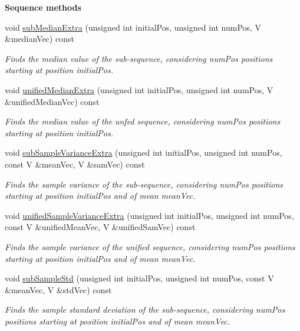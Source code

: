 \begin{Indent}{\bf Sequence methods}
\begin{DoxyCompactItemize}
void \hyperlink{class_q_u_e_s_o_1_1_sequence_of_vectors_ab2ebb58b191d40323da456b82fad2dc6}{sub\-Median\-Extra} (unsigned int initial\-Pos, unsigned int num\-Pos, V \&median\-Vec) const 
\begin{DoxyCompactList}\small\item\em Finds the median value of the sub-\/sequence, considering {\ttfamily num\-Pos} positions starting at position {\ttfamily initial\-Pos}. \end{DoxyCompactList}\item 
void \hyperlink{class_q_u_e_s_o_1_1_sequence_of_vectors_a98ea24cb28d79de06ce89c12dfbc3d61}{unified\-Median\-Extra} (unsigned int initial\-Pos, unsigned int num\-Pos, V \&unified\-Median\-Vec) const 
\begin{DoxyCompactList}\small\item\em Finds the median value of the unfed sequence, considering {\ttfamily num\-Pos} positions starting at position {\ttfamily initial\-Pos}. \end{DoxyCompactList}\item 
void \hyperlink{class_q_u_e_s_o_1_1_sequence_of_vectors_ad21147b7594224e8de732f8b3b631fc3}{sub\-Sample\-Variance\-Extra} (unsigned int initial\-Pos, unsigned int num\-Pos, const V \&mean\-Vec, V \&sam\-Vec) const 
\begin{DoxyCompactList}\small\item\em Finds the sample variance of the sub-\/sequence, considering {\ttfamily num\-Pos} positions starting at position {\ttfamily initial\-Pos} and of mean {\ttfamily mean\-Vec}. \end{DoxyCompactList}\item 
void \hyperlink{class_q_u_e_s_o_1_1_sequence_of_vectors_a10fe04c3cb095aca5c55e5a2d4400e44}{unified\-Sample\-Variance\-Extra} (unsigned int initial\-Pos, unsigned int num\-Pos, const V \&unified\-Mean\-Vec, V \&unified\-Sam\-Vec) const 
\begin{DoxyCompactList}\small\item\em Finds the sample variance of the unified sequence, considering {\ttfamily num\-Pos} positions starting at position {\ttfamily initial\-Pos} and of mean {\ttfamily mean\-Vec}. \end{DoxyCompactList}\item 
void \hyperlink{class_q_u_e_s_o_1_1_sequence_of_vectors_aab6366ba47a9513aa240bf600930367f}{sub\-Sample\-Std} (unsigned int initial\-Pos, unsigned int num\-Pos, const V \&mean\-Vec, V \&std\-Vec) const 
\begin{DoxyCompactList}\small\item\em Finds the sample standard deviation of the sub-\/sequence, considering {\ttfamily num\-Pos} positions starting at position {\ttfamily initial\-Pos} and of mean {\ttfamily mean\-Vec}. \end{DoxyCompactList}\item 

\end{DoxyCompactItemize}
\end{Indent}
